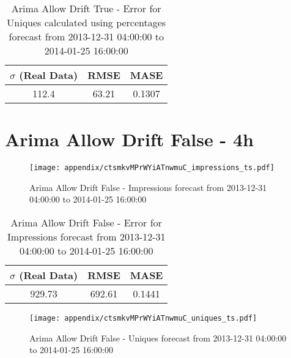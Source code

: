 \begin{table}[H]
\centering
\footnotesize
\begin{tabular}{ccc}
$\sigma$ (Real Data) & RMSE & MASE   \\ \hline
112.4 & 63.21 & 0.1307 \\
\end{tabular}

\vspace{0.5cm}

\caption[]{
Arima Allow Drift True - Error for Uniques calculated using percentages forecast from 2013-12-31 04:00:00 to 2014-01-25 16:00:00}
\end{table}

\section{Arima Allow Drift False - 4h}
\begin{figure}[H] \begin{center} \leavevmode
\texttt{[image: appendix/ctsmkvMPrWYiATnwmuC\_impressions\_ts.pdf]} \caption[]{
Arima Allow Drift False - Impressions forecast from 2013-12-31 04:00:00 to 2014-01-25 16:00:00} \label{fig:appendix/ctsmkvMPrWYiATnwmuC_impressions_ts.pdf} \end{center}
\end{figure}

\begin{table}[H]
\centering
\footnotesize
\begin{tabular}{ccc}
$\sigma$ (Real Data) & RMSE & MASE   \\ \hline
929.73 & 692.61 & 0.1441 \\
\end{tabular}

\vspace{0.5cm}

\caption[]{
Arima Allow Drift False - Error for Impressions forecast from 2013-12-31 04:00:00 to 2014-01-25 16:00:00}
\end{table}

\begin{figure}[H] \begin{center} \leavevmode
\texttt{[image: appendix/ctsmkvMPrWYiATnwmuC\_uniques\_ts.pdf]} \caption[]{
Arima Allow Drift False - Uniques forecast from 2013-12-31 04:00:00 to 2014-01-25 16:00:00} \label{fig:appendix/ctsmkvMPrWYiATnwmuC_uniques_ts.pdf} \end{center}
\end{figure}

